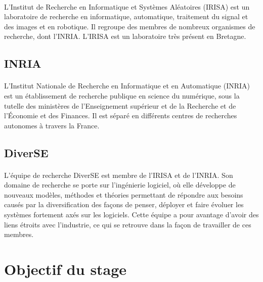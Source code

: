 \documentclass[11pt, a4paper, pdftex]{article}
\begin{document}
        \paragraph{}
            L'Institut de Recherche en Informatique et Systèmes Aléatoires (IRISA) est un laboratoire de recherche en informatique, automatique,
            traitement du signal et des images et en robotique. Il regroupe des membres de nombreux organismes de recherche, dont l'INRIA\@.
            L'IRISA est un laboratoire très présent en Bretagne.
    \vspace{1cm}
    \subsection{INRIA}\label{subsec:inria}
        \paragraph{}
            L'Institut Nationale de Recherche en Informatique et en Automatique (INRIA) est un établissement de recherche publique en science du numérique,
            sous la tutelle des ministères de l'Enseignement supérieur et de la Recherche et de l'Économie et des Finances.
            Il est séparé en différents centres de recherches autonomes à travers la France.
    \vspace{1cm}
    \subsection{DiverSE}\label{subsec:diverse}
             \paragraph{}
                L'équipe de recherche DiverSE est membre de l'IRISA et de l'INRIA. Son domaine de recherche se porte sur l'ingénierie logiciel, où elle développe de nouveaux modèles,
                méthodes et théories permettant de répondre aux besoins causés par la diversification des façons de penser, déployer et faire évoluer les systèmes fortement axés sur les logiciels.
                Cette équipe a pour avantage d'avoir des liens étroits avec l'industrie, ce qui se retrouve dans la façon de travailler de ces membres.
    \newpage
    \section{Objectif du stage}\label{sec:objsta}
    \vspace{1cm}
\end{document}
